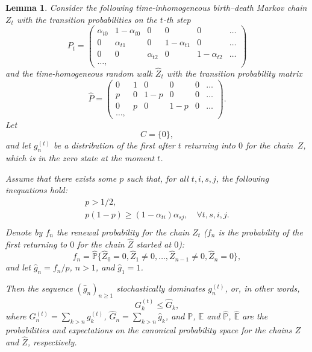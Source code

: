 \documentclass[numbers,compress,v1.0.1]{vmsta}
\newtheorem{lemma}{Lemma}
\theoremstyle{definition}
\newcommand{\lleft}{\left}
\newcommand{\rright}{\right}
\begin{document}
\begin{lemma}\label{lemma2}
Consider the following time-inhomogeneous birth--death Markov chain
$Z_t$ with the transition probabilities on the $t$-th step
%
\begin{equation}
P_t = \lleft( %
\begin{array}{cccccc}
\alpha_{t0}& 1-\alpha_{t0}& 0& 0& 0&\ldots\\
0& \alpha_{t1}& 0& 1-\alpha_{t1}& 0& \ldots\\
0& 0& \alpha_{t2}& 0& 1-\alpha_{t2}& \ldots\\
\ldots,
\end{array} %
 \rright)
\end{equation}
%
and the time-homogeneous random walk $\hat Z_t$ with the transition
probability matrix
%
\begin{equation}
\hat P = \lleft( %
\begin{array}{cccccc}
0 & 1& 0& 0& 0&\ldots\\
p& 0& 1-p& 0& 0& \ldots\\
0& p& 0& 1-p& 0& \ldots\\
\ldots,
\end{array} %
 \rright).
\end{equation}
%
Let
%
\[
C = \{0\},
\]
%
and let $g^{(t)}_n$ be a distribution of the first after $t$ returning
into $0$ for the chain~$Z$, which is in the zero state at the moment
$t$.

Assume that there exists some $p$ such that, for all $t,i,s,j$, the
following inequations hold:
%
\begin{equation}
\label{p_cond} %
\begin{array}{c}
p > 1/2,\\[3pt]
p(1-p) \ge(1-\alpha_{ti})\alpha_{sj}, \quad \forall t,s,i,j.\\
\end{array} %
\end{equation}
%
Denote by $f_n$ the renewal probability for the chain $\hat Z_t$ ($f_n$
is the probability of the first returning to $0$ for the chain $\hat Z$
started at $0$):
%
\begin{equation}
f_n = \mathbb{\hat P}\{\hat Z_0 = 0, \hat
Z_1 \neq0, \ldots, \hat Z_{n-1} \neq0, \hat Z_n =
0\},
\end{equation}
%
and let $\hat g_n = f_n/p$, $n > 1$, and $\hat g_1 = 1$.

Then the sequence $(\hat g_n)_{n\ge1}$ stochastically dominates
$g^{(t)}_n$, or, in other words,
%
\begin{equation}
G^{(t)}_k \le \hat G_k,
\end{equation}
%
where $G^{(t)}_n = \sum_{k > n} g^{(t)}_k$, $\hat G_n = \sum_{k > n}
\hat g_k$,
and $\mathbb{P}$, $\mathbb{E}$ and $\mathbb{\hat P}$, $\mathbb{\hat E}$
are the probabilities and expectations on the canonical probability
space for the chains $Z$ and $\hat Z$,
respectively.
\end{lemma}
\end{document}
